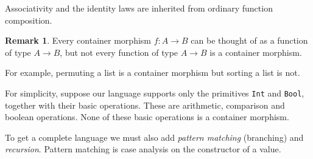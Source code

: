 \documentclass[11pt, a4paper]{article}
\theoremstyle{definition}
\newtheorem{remark}[definition]{Remark}
\theoremstyle{plain}
\begin{document}
\medskip

\noindent
Associativity and the identity laws are inherited from ordinary
function composition.

\begin{remark}\label{rem:functions-as-morphisms}
Every container morphism $f : A \to B$ can be thought of as a
function of type $A \to B$, but not every function of type
$A \to B$ is a container morphism.

For example, permuting a list is a container morphism but sorting
a list is not.

For simplicity, suppose our language supports only the primitives
\texttt{Int} and \texttt{Bool}, together with their basic
operations.  These are arithmetic, comparison and boolean operations.  None
of these basic operations is a container morphism.

To get a complete language we must also add
\emph{pattern matching} (branching) and \emph{recursion}.  Pattern matching is
case analysis on the constructor of a value.
\end{remark}
\end{document}
